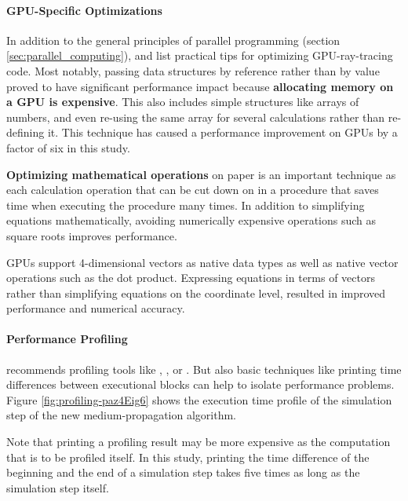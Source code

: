 \paragraph{GPU-Specific Optimizations}

In addition to the general principles of parallel programming (section
\ref{sec:parallel_computing}),  and 
\cite{raytracingtips} list practical tips for optimizing GPU-ray-tracing
code. Most notably, passing data structures by reference rather than by
value proved to have significant performance impact because
\textbf{allocating memory on a GPU is expensive}. This also includes
simple structures like arrays of numbers, and even re-using the same
array for several calculations rather than re-defining it. This
technique has caused a performance improvement on GPUs by a factor of
six in this study.


\textbf{Optimizing mathematical operations} on paper is an important
technique as each calculation operation that can be cut down on in a
procedure that saves time when executing the procedure many times. In
addition to simplifying equations mathematically, avoiding numerically
expensive operations such as square roots improves performance.

GPUs support 4-dimensional vectors as native data types as well as
native vector operations such as the dot product. Expressing equations
in terms of vectors rather than simplifying equations on the coordinate
level, resulted in improved performance and numerical accuracy.


\paragraph{Performance Profiling}

 recommends profiling tools like ,
, or  \cite{cudacourse}. But also basic
techniques like printing time differences between executional blocks can
help to isolate performance problems. Figure
\ref{fig:profiling-paz4Eig6} shows the execution time profile of the
simulation step of the new medium-propagation algorithm.

Note that printing a profiling result may be more expensive as the
computation that is to be profiled itself. In this study, printing the
time difference of the beginning and the end of a simulation step takes
five times as long as the simulation step itself.

